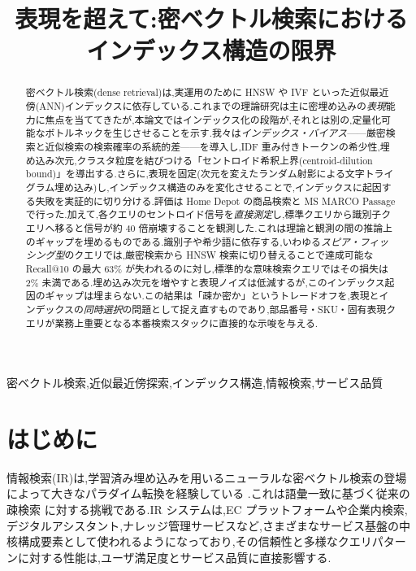 \documentclass[conference]{IEEEtran}
\begin{document}
\title{表現を超えて:密ベクトル検索におけるインデックス構造の限界}

\author{
}

\maketitle

\begin{abstract}
密ベクトル検索(dense retrieval)は,実運用のために HNSW や IVF といった近似最近傍(ANN)インデックスに依存している.これまでの理論研究は主に密埋め込みの\emph{表現}能力に焦点を当ててきたが,本論文ではインデックス化の段階が,それとは別の,定量化可能なボトルネックを生じさせることを示す.我々は\emph{インデックス・バイアス}——厳密検索と近似検索の検索確率の系統的差——を導入し,IDF 重み付きトークンの希少性,埋め込み次元,クラスタ粒度を結びつける「セントロイド希釈上界(centroid-dilution bound)」を導出する.さらに,表現を固定(次元を変えたランダム射影による文字トライグラム埋め込み)し,インデックス構造のみを変化させることで,インデックスに起因する失敗を実証的に切り分ける.評価は Home Depot の商品検索と MS MARCO Passage で行った.加えて,各クエリのセントロイド信号を\emph{直接測定}し,標準クエリから識別子クエリへ移ると信号が約 40 倍崩壊することを観測した.これは理論と観測の間の推論上のギャップを埋めるものである.識別子や希少語に依存する,いわゆる\emph{スピア・フィッシング型}のクエリでは,厳密検索から HNSW 検索に切り替えることで達成可能な Recall@10 の最大 63\% が失われるのに対し,標準的な意味検索クエリではその損失は 2\% 未満である.埋め込み次元を増やすと表現ノイズは低減するが,このインデックス起因のギャップは埋まらない.この結果は「疎か密か」というトレードオフを,表現とインデックスの\emph{同時選択}の問題として捉え直すものであり,部品番号・SKU・固有表現クエリが業務上重要となる本番検索スタックに直接的な示唆を与える.
\end{abstract}

\begin{IEEEkeywords}
密ベクトル検索,近似最近傍探索,インデックス構造,情報検索,サービス品質
\end{IEEEkeywords}

\section{はじめに}
情報検索(IR)は,学習済み埋め込みを用いるニューラルな密ベクトル検索の登場によって大きなパラダイム転換を経験している \cite{ma2022survey}.これは語彙一致に基づく従来の疎検索 \cite{karpukhin2020dense, xiong2021approximate} に対する挑戦である.IR システムは,EC プラットフォームや企業内検索,デジタルアシスタント,ナレッジ管理サービスなど,さまざまなサービス基盤の中核構成要素として使われるようになっており,その信頼性と多様なクエリパターンに対する性能は,ユーザ満足度とサービス品質に直接影響する.
\end{document}
